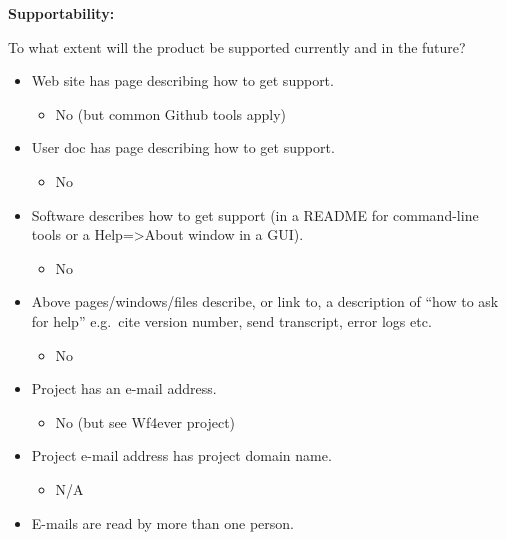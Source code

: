 \textbf{Supportability:}

To what extent will the product be supported currently and in the
future?

\begin{itemize}
\itemsep1pt\parskip0pt
\item
  Web site has page describing how to get support.

  \begin{itemize}
  \itemsep1pt\parskip0pt
  \item
    No (but common Github tools apply)
  \end{itemize}
\item
  User doc has page describing how to get support.

  \begin{itemize}
  \itemsep1pt\parskip0pt
  \item
    No
  \end{itemize}
\item
  Software describes how to get support (in a README for command-line
  tools or a Help=\textgreater{}About window in a GUI).

  \begin{itemize}
  \itemsep1pt\parskip0pt
  \item
    No
  \end{itemize}
\item
  Above pages/windows/files describe, or link to, a description of ``how
  to ask for help'' e.g.~cite version number, send transcript, error
  logs etc.

  \begin{itemize}
  \itemsep1pt\parskip0pt
  \item
    No
  \end{itemize}
\item
  Project has an e-mail address.

  \begin{itemize}
  \itemsep1pt\parskip0pt
  \item
    No (but see Wf4ever project)
  \end{itemize}
\item
  Project e-mail address has project domain name.

  \begin{itemize}
  \itemsep1pt\parskip0pt
  \item
    N/A
  \end{itemize}
\item
  E-mails are read by more than one person.


\end{itemize}
